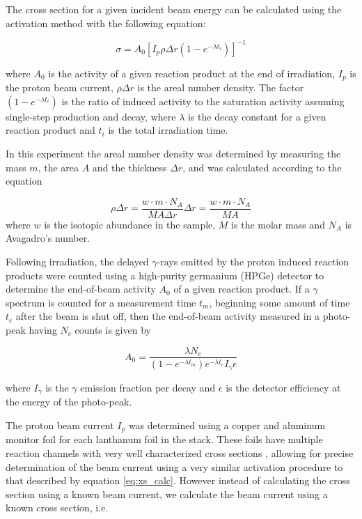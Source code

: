 \documentclass[aps,superscriptaddress,twocolumn,secnumarabic,balancelastpage,amsmath,amssymb,nofootinbib,floatfix]{revtex4-1}
\begin{document}
The cross section for a given incident beam energy can be calculated using the activation method with the following equation:

\begin{equation}
\sigma =  A_0[I_p \rho \Delta r (1-e^{-\lambda t_i})]^{-1}
\label{eq:xs_calc}
\end{equation}

where $A_0$ is the activity of a given reaction product at the end of irradiation, $I_p$ is the proton beam current, $\rho \Delta r$ is the areal number density. The factor $(1-e^{-\lambda t_i})$ is the ratio of induced activity to the saturation activity assuming single-step production and decay, where $\lambda$ is the decay constant for a given reaction product and $t_i$ is the total irradiation time.  

In this experiment the areal number density was determined by measuring the mass $m$, the area $A$ and the thickness $\Delta r$, and was calculated according to the equation

\begin{equation}
\rho \Delta r=\frac{w\cdot m \cdot N_A}{MA\Delta r}\Delta r = \frac{w\cdot m \cdot N_A}{MA}
\label{eq:number_density}
\end{equation}
where $w$ is the isotopic abundance in the sample, $M$ is the molar mass and $N_A$ is Avagadro's number.  

Following irradiation, the delayed $\gamma$-rays emitted by the proton induced reaction products were counted using a high-purity germanium (HPGe) detector to determine the end-of-beam activity $A_0$ of a given reaction product.  If a $\gamma$ spectrum is counted for a measurement time $t_m$, beginning some amount of time $t_c$ after the beam is shut off, then the end-of-beam activity measured in a photo-peak having $N_c$ counts is given by

\begin{equation}
A_0 = \frac{\lambda N_c}{(1-e^{-\lambda t_m})e^{-\lambda t_c}I_{\gamma}\epsilon}
\label{eq:activity}
\end{equation}

where $I_{\gamma}$ is the $\gamma$ emission fraction per decay and $\epsilon$ is the detector efficiency at the energy of the photo-peak.

The proton beam current $I_p$ was determined using a copper and aluminum monitor foil for each lanthanum foil in the stack.  These foils have multiple reaction channels with very well characterized cross sections \cite{IAEACPR}, allowing for precise determination of the beam current using a very similar activation procedure to that described by equation \ref{eq:xs_calc}. However instead of calculating the cross section using a known beam current, we calculate the beam current using a known cross section, i.e.
\end{document}
